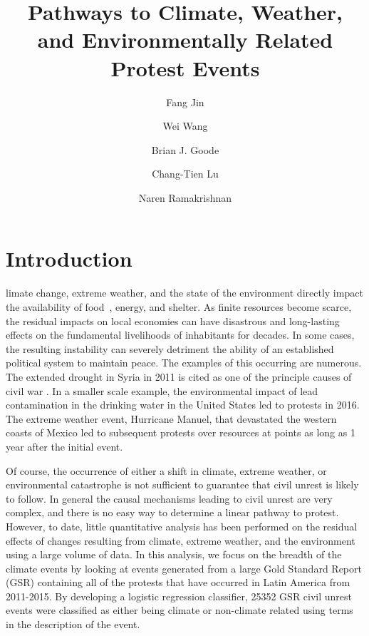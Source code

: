 \documentclass[9pt,twocolumn,twoside]{pnas-new}
\title{Pathways to Climate, Weather, and Environmentally Related Protest Events}
\author[a,1]{Fang Jin}
\author[a]{Wei Wang}
\author[a]{Brian J. Goode}
\author[a]{Chang-Tien Lu}
\author[a]{Naren Ramakrishnan}
\affil[a]{Discovery Analytics Center (Dept. of Computer Science), Virginia Tech - NCR, Arlington, VA 22203}
\begin{document}
\verticaladjustment{-2pt}

\maketitle
\thispagestyle{firststyle}
\section{Introduction}
limate change, extreme weather, and the state of the environment directly impact the availability of food~\cite{RW3}, energy, and shelter.
As finite resources become scarce, the residual impacts on local economies can have disastrous and long-lasting effects on the fundamental livelihoods of inhabitants for decades.
In some cases, the resulting instability can severely detriment the ability of an established political system to maintain peace.
The examples of this occurring are numerous.
The extended drought in Syria in 2011 is cited as one of the principle causes of civil war \cite{gleick2014water,kelley2015climate}.
In a smaller scale example, the environmental impact of lead contamination in the drinking water in the United States led to protests in 2016.
The extreme weather event, Hurricane Manuel, that devastated the western coasts of Mexico led to subsequent protests over resources at points as long as 1 year after the initial event.

Of course, the occurrence of either a shift in climate, extreme weather, or environmental catastrophe is not sufficient to guarantee that civil unrest is likely to follow.
In general the causal mechanisms leading to civil unrest are very complex, and there is no easy way to determine a linear pathway to protest.
However, to date, little quantitative analysis has been performed on the residual effects of changes resulting from climate, extreme weather, and the environment using a large volume of data.
In this analysis, we focus on the breadth of the climate events by looking at events generated from a large Gold Standard Report (GSR) containing all of the protests that have occurred in Latin America from 2011-2015.
By developing a logistic regression classifier, 25352 GSR civil unrest events were classified as either being climate or non-climate related using terms in the description of the event.
\end{document}
